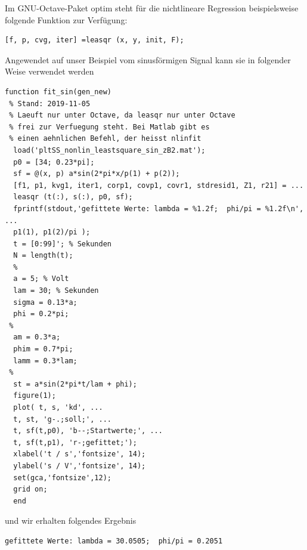 Im GNU-Octave-Paket \textsf{optim} steht für die nichtlineare Regression
beispielsweise folgende Funktion zur Verfügung:
\begin{verbatim}
[f, p, cvg, iter] =leasqr (x, y, init, F);
\end{verbatim}
Angewendet auf unser Beispiel vom sinusförmigen Signal kann sie in folgender Weise
verwendet werden
\begin{lstlisting}[style=Matlab]
function fit_sin(gen_new)
 % Stand: 2019-11-05
 % Laeuft nur unter Octave, da leasqr nur unter Octave
 % frei zur Verfuegung steht. Bei Matlab gibt es
 % einen aehnlichen Befehl, der heisst nlinfit
  load('pltSS_nonlin_leastsquare_sin_zB2.mat');
  p0 = [34; 0.23*pi];
  sf = @(x, p) a*sin(2*pi*x/p(1) + p(2));
  [f1, p1, kvg1, iter1, corp1, covp1, covr1, stdresid1, Z1, r21] = ...
  leasqr (t(:), s(:), p0, sf);
  fprintf(stdout,'gefittete Werte: lambda = %1.2f;  phi/pi = %1.2f\n', ...
  p1(1), p1(2)/pi );
  t = [0:99]'; % Sekunden
  N = length(t);
  %
  a = 5; % Volt
  lam = 30; % Sekunden
  sigma = 0.13*a;
  phi = 0.2*pi;
 %
  am = 0.3*a;
  phim = 0.7*pi;
  lamm = 0.3*lam;
 %
  st = a*sin(2*pi*t/lam + phi);
  figure(1);
  plot( t, s, 'kd', ...
  t, st, 'g-.;soll;', ...
  t, sf(t,p0), 'b--;Startwerte;', ...
  t, sf(t,p1), 'r-;gefittet;');
  xlabel('t / s','fontsize', 14);
  ylabel('s / V','fontsize', 14);
  set(gca,'fontsize',12);
  grid on;
  end
\end{lstlisting}
und wir erhalten folgendes Ergebnis
\begin{verbatim}
gefittete Werte: lambda = 30.0505;  phi/pi = 0.2051
\end{verbatim}

\newpage
